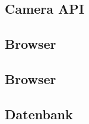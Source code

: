 \subsection{Camera API}

\subsection{Browser} 



\subsection{Browser}

\subsection{Datenbank}

\newpage